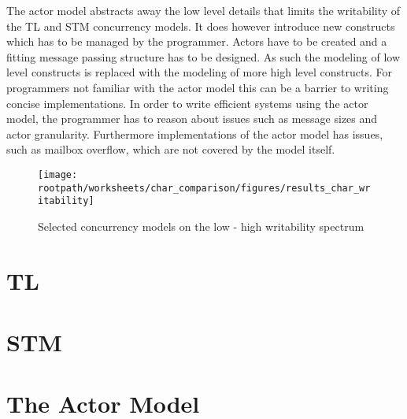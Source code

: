 The actor model abstracts away the low level details that limits the writability of the \ac{TL} and \ac{STM} concurrency models. It does however introduce new constructs which has to be managed by the programmer. Actors have to be created and a fitting message passing structure has to be designed. As such the modeling of low level constructs is replaced with the modeling of more high level constructs. For programmers not familiar with the actor model this can be a barrier to writing concise implementations. In order to write efficient systems using the actor model, the programmer has to reason about issues such as message sizes and actor granularity. Furthermore implementations of the actor model has issues, such as mailbox overflow, which are not covered by the model itself.

\begin{figure}[htbp]
\centering
 \texttt{[image: \\rootpath/worksheets/char\_comparison/figures/results\_char\_writability]} 
 \caption{Selected concurrency models on the low - high writability spectrum}
\label{fig:results_char_writability}
\end{figure}

\section{\acl{TL}}

\section{\acl{STM}}
\section{The Actor Model}

\worksheetend
